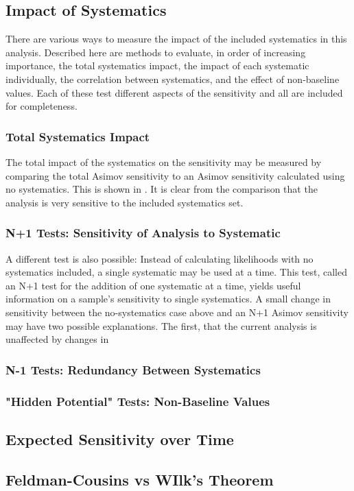 \label{subsec:systematics_impact}
\subsection{Impact of Systematics}
There are various ways to measure the impact of the included systematics in this analysis.
Described here are methods to evaluate, in order of increasing importance, the total systematics impact, the impact of each systematic individually, the correlation between systematics, and the effect of non-baseline values.
Each of these test different aspects of the sensitivity and all are included for completeness.

\subsubsection{Total Systematics Impact}
The total impact of the systematics on the sensitivity may be measured by comparing the total Asimov sensitivity to an Asimov sensitivity calculated using no systematics.
This is shown in .
It is clear from the comparison that the analysis is very sensitive to the included systematics set.

\subsubsection{N+1 Tests: Sensitivity of Analysis to Systematic}
A different test is also possible: Instead of calculating likelihoods with no systematics included, a single systematic may be used at a time.
This test, called an N+1 test for the addition of one systematic at a time, yields useful information on a sample's sensitivity to single systematics.
A small change in sensitivity between the no-systematics case above and an N+1 Asimov sensitivity may have two possible explanations.
The first, that the current analysis is unaffected by changes in 


\subsubsection{N-1 Tests: Redundancy Between Systematics}

\subsubsection{"Hidden Potential" Tests: Non-Baseline Values}


\label{subsec:sensitivity_vs_time}
\subsection{Expected Sensitivity over Time}



\label{subsec:wilks}
\subsection{Feldman-Cousins vs WIlk's Theorem}